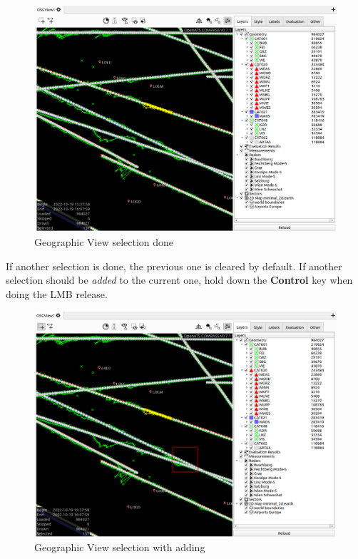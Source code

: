 \begin{figure}[H]
    \hspace*{-2.5cm}
    \includegraphics[width=19cm,frame]{figures/geoview_select2.png}
  \caption{Geographic View selection done}
\end{figure}

If another selection is done, the previous one is cleared by default. If another selection should be \textit{added} to the current one, hold down the \textbf{Control} key when doing the LMB release.

\begin{figure}[H]
    \hspace*{-2.5cm}
    \includegraphics[width=19cm,frame]{figures/geoview_select_add1.png}
  \caption{Geographic View selection with adding}
\end{figure}

